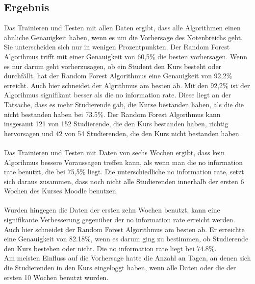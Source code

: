 \subsection{Ergebnis}
Das Trainieren und Testen mit allen Daten ergibt, dass alle Algorithmen einen ähnliche Genauigkeit haben, wenn es um die Vorhersage des Notenbreichs geht.
Sie unterscheiden sich nur in wenigen Prozentpunkten. Der Random Forest Algorihmus trifft mit einer Genauigkeit von 60,5\% die besten vorhersagen.
Wenn es nur darum geht vorherzusagen, ob ein Student den Kurs besteht oder durchfällt, hat der Random Forest Algorithmus eine Genauigkeit von 92,2\% erreicht.
Auch hier schneidet der Algrithmus am besten ab. Mit den 92,2\% ist der Algorihmus signifikant besser als die \glqq no information rate\grqq{}.
Diese liegt an der Tatsache, dass es mehr Studierende gab, die Kurse bestanden haben, als die die nicht bestanden haben bei 73.5\%.
Der Random Forest Algorihmus kann insgesamt 121 von 152 Studierende, die den Kurs bestanden haben, richtig hervorsagen und 42 von 54 Studierenden, die den Kurs nicht bestanden haben. \cite[S. 9f]{Quinn.2020}
\\ \\ \noindent
Das Trainieren und Testen mit Daten von sechs Wochen ergibt, dass kein Algorihmus bessere Voraussagen treffen kann, als wenn man die \glqq no information rate\grqq{} benutzt,
die bei 75,5\% liegt. Die unterschiedliche \glqq no information rate\grqq{}, setzt sich daraus zusammen, dass noch nicht alle Studierenden innerhalb der ersten 6 Wochen des Kurses Moodle benutzen. \cite[S. 10f]{Quinn.2020}
\\ \noindent \\ \noindent
Wurden hingegen die Daten der ersten zehn Wochen benutzt, kann eine signifikante Verbesserung gegenüber der \glqq no information rate\grqq{} erreicht werden.
Auch hier schneidet der Random Forest Algorithmus am besten ab. Er erreichte eine Genauigkeit von 82.18\%, wenn es darum ging zu bestimmen, ob Studierende den Kurs bestehen oder nicht.
Die \glqq no information rate\grqq{} liegt bei 74.8\%. \cite[S. 10f]{Quinn.2020}
\\ \noindent \newline \noindent
Am meisten Einfluss auf die Vorhersage hatte die Anzahl an Tagen, an denen sich die Studierenden in den Kurs eingeloggt haben, wenn alle Daten oder die der ersten 10 Wochen benutzt wurden. \cite[S. 15]{Quinn.2020}

